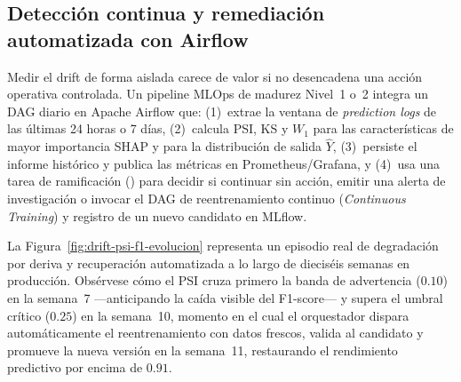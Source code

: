 \subsection{Detección continua y remediación automatizada con Airflow}

Medir el drift de forma aislada carece de valor si no desencadena una acción operativa controlada. Un pipeline MLOps de madurez Nivel~1 o~2 integra un DAG diario en Apache Airflow que: (1)~extrae la ventana de \textit{prediction logs} de las últimas 24 horas o 7 días, (2)~calcula PSI, KS y $W_1$ para las características de mayor importancia SHAP y para la distribución de salida $\hat{Y}$, (3)~persiste el informe histórico y publica las métricas en Prometheus/Grafana, y (4)~usa una tarea de ramificación () para decidir si continuar sin acción, emitir una alerta de investigación o invocar el DAG de reentrenamiento continuo (\textit{Continuous Training}) y registro de un nuevo candidato en MLflow.

La Figura~\ref{fig:drift-psi-f1-evolucion} representa un episodio real de degradación por deriva y recuperación automatizada a lo largo de dieciséis semanas en producción. Obsérvese cómo el PSI cruza primero la banda de advertencia ($0.10$) en la semana~7 ---anticipando la caída visible del F1-score--- y supera el umbral crítico ($0.25$) en la semana~10, momento en el cual el orquestador dispara automáticamente el reentrenamiento con datos frescos, valida al candidato y promueve la nueva versión en la semana~11, restaurando el rendimiento predictivo por encima de $0.91$.

